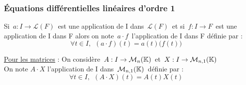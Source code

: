 \subsubsection[EDL d'ordre 1]{Équations différentielles linéaires d'ordre 1}

\vspace{1.5cm}

Si \(\,a:I\to \mathscr{L}(F)\,\) est une application de I dans \(\,\mathscr{L}(F)\,\) et si \(\,f:I\to F\,\) est une application de I dans F alors on note \(\,a\cdot f\,\) l'application de I dans F définie par :\vspace{-0.2cm}
\[\forall t\in I,\ \ (a\cdot f)(t)=a(t)\bigl(f(t)\bigr)\]

\vspace{0.7cm}

\underline{Pour les matrices} : On considère \(\,A:I\to\mathcal{M}_n(\mathbb{K})\,\) et \(\, X:I\to \mathcal{M}_{n,1}(\mathbb{K}) \)\vspace{0.1cm}\\
On note \(A\cdot X\) l'application de I dans \(\,\mathcal{M}_{n,1}(\mathbb{K})\, \) définie par :\vspace{-0.2cm}
\[\forall t\in I,\ \ \left(A\cdot X\right)(t)=A(t)X(t)\]

\vspace{1.7cm}

